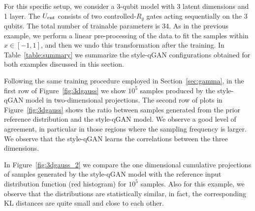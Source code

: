 \documentclass[twocolumn,preprintnumbers,superscriptaddress]{revtex4-2}
\begin{document}
For this specific setup, we consider a 3-qubit model with 3 latent dimensions and
1 layer. The $U_{\rm ent}$ consists of two controlled-$R_{y}$ gates acting sequentially on the 3 qubits.
The total number of trainable parameters is 34. As in the previous example, we perform a linear pre-processing of the data to fit the samples within $x \in [-1, 1]$, and then we undo this transformation after the training. In Table~\ref{table:summary}
we summarize the style-qGAN configurations obtained for both examples discussed in
this section.

Following the same training procedure employed in Section~\ref{sec:gamma}, in
the first row of Figure~\ref{fig:3dgauss} we show $10^5$ samples produced by the
style-qGAN model in two-dimensional projections.
%
The second row of plots in Figure~\ref{fig:3dgauss} shows the ratio between
samples generated from the prior reference distribution and the style-qGAN model. We
observe a good level of agreement, in particular in those regions where the
sampling frequency is larger. We observe that the style-qGAN learns the correlations
between the three dimensions.

In Figure~\ref{fig:3dgauss_2} we compare the one dimensional cumulative
projections of samples generated by the style-qGAN model with the reference input
distribution function (red histogram) for $10^5$ samples. Also for this example,
we observe that the distributions are statistically similar, in fact, the
corresponding KL distances are quite small and close to each other.
\end{document}
